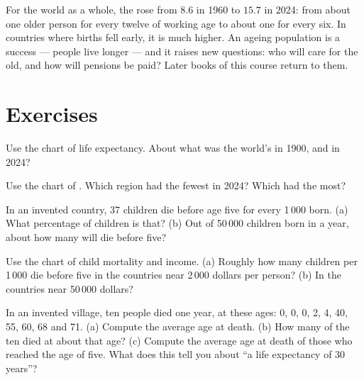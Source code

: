 For the world as a whole, the  rose from $8.6$ in 1960
to $15.7$ in 2024: from about one older person for every twelve of working age
to about one for every six. In countries where births fell early, it is much
higher. An ageing population is a success --- people live longer --- and it
raises new questions: who will care for the old, and how will pensions be paid?
Later books of this course return to them.

\section{Exercises}

\begin{exercise}[$\star$]\label{exo:g6:health-and-population:1}
Use the chart of life expectancy. About what was the world's  in 1900, and in 2024?
\end{exercise}

\begin{exercise}[$\star$]\label{exo:g6:health-and-population:2}
Use the chart of . Which region had the fewest 
in 2024? Which had the most?
\end{exercise}

\begin{exercise}[$\star$]\label{exo:g6:health-and-population:3}
In an invented country, 37 children die before age five for every 1\,000 born.
(a) What percentage of children is that? (b) Out of 50\,000 children born in a
year, about how many will die before five?
\end{exercise}

\begin{exercise}[$\star$]\label{exo:g6:health-and-population:4}
Use the chart of child mortality and income. (a) Roughly how many children per
1\,000 die before five in the countries near 2\,000 dollars per person? (b) In
the countries near 50\,000 dollars?
\end{exercise}

\begin{exercise}[$\star\star$]\label{exo:g6:health-and-population:5}
In an invented village, ten people died one year, at these ages: 0, 0, 0, 2, 4,
40, 55, 60, 68 and 71. (a) Compute the average age at death. (b) How many of the
ten died at about that age? (c) Compute the average age at death of those who
reached the age of five. What does this tell you about ``a life expectancy of
30 years''?
\end{exercise}

